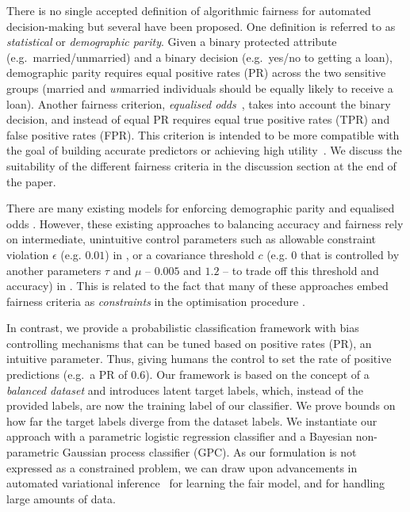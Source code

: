 There is no single accepted definition of algorithmic fairness for automated decision-making
but several have been proposed.
One definition is referred to as \emph{statistical} or \emph{demographic parity}.
Given a binary protected attribute (e.g.\ married/unmarried) and a binary decision (e.g.\ yes/no to getting a loan),
demographic parity requires equal positive rates (PR) across the two sensitive groups (married and \emph{un}married individuals should be equally likely to receive a loan).
%
Another fairness criterion, \emph{equalised odds}~\citep{hardt2016equality},
takes into account the binary decision, and instead of equal PR requires equal true positive rates (TPR) and false positive rates (FPR).
This criterion is intended to be more compatible with the goal of building accurate predictors or achieving high utility~\citep{hardt2016equality}.
We discuss the suitability of the different fairness criteria in the discussion section at the end of the paper.

There are many existing models for enforcing demographic parity and equalised odds
\citep{CreMadJacWeietal19,AgaBeyDudLanetal18,calders2009building,kamishima2012fairness,zafar2017fairnesstreatment,zafar2017fairnessconstraints}.
However, these existing approaches to balancing accuracy and fairness rely on intermediate, unintuitive control parameters such as allowable constraint violation $\epsilon$ (e.g. $0.01$) in \citet{AgaBeyDudLanetal18}, or a covariance threshold $c$
(e.g. $0$ that is controlled by another parameters $\tau$ and $\mu$ -- $0.005$ and $1.2$ -- to trade off this threshold and accuracy)
in \citet{zafar2017fairnesstreatment}.
This is related to the fact that many of these approaches embed fairness criteria as \emph{constraints} in the optimisation procedure
\citep{DonOneBenShaetal18,quadrianto2017recycling,zafar2017fairnesstreatment,zafar2017fairnessconstraints}.

In contrast, we provide a probabilistic classification framework with bias controlling mechanisms that can be tuned based on positive rates (PR),
an intuitive parameter.
Thus, giving humans the control to set the rate of positive predictions (e.g.\ a PR of $0.6$).
Our framework is based on the concept of a \emph{balanced dataset}
and introduces latent target labels, which, instead of the provided labels, are now the training label of our classifier.
We prove bounds on how far the target labels diverge from the dataset labels.
We instantiate our approach with a parametric logistic regression classifier and a Bayesian non-parametric Gaussian process classifier (GPC).
%
As our formulation is not expressed as a constrained problem,
we can draw upon advancements in automated variational inference~\citep{bonilla2016generic,gardner2018gpytorch,krauth2016autogp}
for learning the fair model, and for handling large amounts of data.

